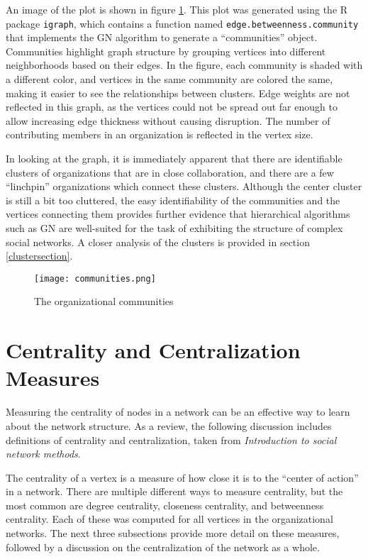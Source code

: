 An image of the plot is shown in figure \ref{fig:orgCommunities}. This plot was generated using the R package \verb|igraph|, which contains a function named \verb|edge.betweenness.community| that implements the GN algorithm to generate a ``communities'' object. Communities highlight graph structure by grouping vertices into different neighborhoods based on their edges. In the figure, each community is shaded with a different color, and vertices in the same community are colored the same, making it easier to see the relationships between clusters. Edge weights are not reflected in this graph, as the vertices could not be spread out far enough to allow increasing edge thickness without causing disruption. The number of contributing members in an organization is reflected in the vertex size.

In looking at the graph, it is immediately apparent that there are identifiable clusters of organizations that are in close collaboration, and there are a few ``linchpin'' organizations which connect these clusters. Although the center cluster is still a bit too cluttered, the easy identifiability of the communities and the vertices connecting them provides further evidence that hierarchical algorithms such as GN are well-suited for the task of exhibiting the structure of complex social networks. A closer analysis of the clusters is provided in section \ref{clustersection}.
\begin{figure}
	\texttt{[image: communities.png]}
	\centering
	\caption{The organizational communities}
	\label{fig:orgCommunities}
\end{figure}

\section{Centrality and Centralization Measures}


Measuring the centrality of nodes in a network can be an effective way to learn about the network structure. As a review, the following discussion includes definitions of centrality and centralization, taken from \textit{Introduction to social network methods}\cite{hanneman}.

The centrality of a vertex is a measure of how close it is to the ``center of action'' in a network. There are multiple different ways to measure centrality, but the most common are degree centrality, closeness centrality, and betweenness centrality. Each of these was computed for all vertices in the organizational networks. The next three subsections provide more detail on these measures, followed by a discussion on the centralization of the network as a whole.

